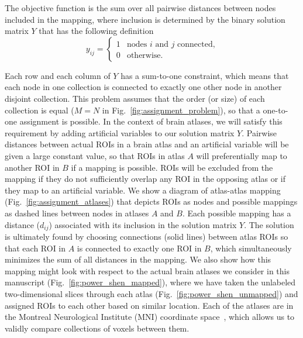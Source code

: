 \documentclass[10pt,letterpaper]{article}\usepackage[]{graphicx}\usepackage[]{color}
\begin{document}
\vspace{0.25cm}

The objective function is the sum over all pairwise distances between nodes included in the mapping, where inclusion is determined by the binary solution matrix $Y$ that has the following definition
%
\begin{equation}\label{eq:assignment_sol}
y_{ij}=\begin{cases}
1 & \text{nodes } i \text{ and } j \text{ connected,} \\
0 & \text{otherwise.}
\end{cases}
\end{equation}

Each row and each column of $Y$ has a sum-to-one constraint, which means that each node in one collection is connected to exactly one other node in another disjoint collection. This problem assumes that the order (or size) of each collection is equal ($M=N$ in Fig.~\ref{fig:assignment_problem}), so that a one-to-one assignment is possible. In the context of brain atlases, we will satisfy this requirement by adding artificial variables to our solution matrix $Y$. Pairwise distances between actual ROIs in a brain atlas and an artificial variable will be given a large constant value, so that ROIs in atlas $A$ will preferentially map to another ROI in $B$ if a mapping is possible. ROIs will be excluded from the mapping if they do not sufficiently overlap any ROI in the opposing atlas or if they map to an artificial variable. We show a diagram of atlas-atlas mapping (Fig.~\ref{fig:assignment_atlases}) that depicts ROIs as nodes and possible mappings as dashed lines between nodes in atlases $A$ and $B$. Each possible mapping has a distance ($d_{ij}$) associated with its inclusion in the solution matrix $Y$. The solution is ultimately found by choosing connections (solid lines) between atlas ROIs so that each ROI in $A$ is connected to exactly one ROI in $B$, which simultaneously minimizes the sum of all distances in the mapping. We also show how this mapping might look with respect to the actual brain atlases we consider in this manuscript (Fig.~\ref{fig:power_shen_mapped}), where we have taken the unlabeled two-dimensional slices through each atlas (Fig.~\ref{fig:power_shen_unmapped}) and assigned ROIs to each other based on similar location. Each of the atlases are in the Montreal Neurological Institute (MNI) coordinate space~\cite{collins1994}, which allows us to validly compare collections of voxels between them.
\end{document}
